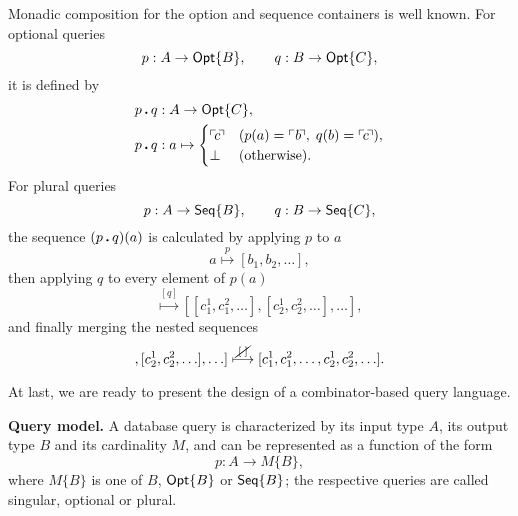 Monadic composition for the option and sequence containers is well known.  For
optional queries
\begin{equation*}
    p : A \to \mathsf{Opt}{\left\{B\right\}}, \qquad q : B \to \mathsf{Opt}{\left\{C\right\}},
\end{equation*}
it is defined by
\begin{align*}
    & p\,\boldsymbol{.}\,q : A \to \mathsf{Opt}{\left\{C\right\}}, \\
    & p\,\boldsymbol{.}\,q : a \mapsto \begin{cases}
        \ulcorner\!c\!\urcorner & (p(a)=\ulcorner\!\,b\!\urcorner,\; q(b)=\ulcorner\!c\!\urcorner), \\
        \bot & (\text{otherwise}).
    \end{cases}
\end{align*}
For plural queries
\begin{equation*}
    p : A \to \mathsf{Seq}{\left\{B\right\}}, \qquad q : B \to \mathsf{Seq}{\left\{C\right\}},
\end{equation*}
the sequence $(p\,\boldsymbol{.}\,q)(a)$ is calculated by applying $p$ to $a$
\begin{equation*}
    a \overset{p}{\longmapsto} [b_1, b_2, \ldots],
\end{equation*}
then applying $q$ to every element of $p(a)$
\begin{equation*}
    [b_1, b_2, \ldots]
    \overset{[q]}{\longmapsto}
    [[c^{1}_{1}, c^{2}_{1}, \ldots], [c^{1}_{2}, c^{2}_{2}, \ldots], \ldots],
\end{equation*}
and finally merging the nested sequences
\begin{equation*}
    [[c^{1}_{1}, c^{2}_{1}, \ldots], [c^{1}_{2}, c^{2}_{2}, \ldots], \ldots]
    \overset{\cancel{\,[\;]\,}}{\longmapsto}
    [c^{1}_{1}, c^{2}_{1}, \ldots, c^{1}_{2}, c^{2}_{2}, \ldots].
\end{equation*}

At last, we are ready to present the design of a com\-binator-based query
language.



\textbf{Query model.} A database query is characterized by its input type $A$,
its output type $B$ and its cardinality $M$, and can be represented as a
function of the form
\begin{equation*}
    p : A \to M\{B\},
\end{equation*}
where $M\{B\}$ is one of $B$, $\mathsf{Opt}{\left\{B\right\}}$ or $\mathsf{Seq}{\left\{B\right\}}$; the respective queries
are called singular, optional or plural.


